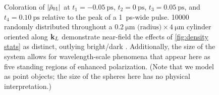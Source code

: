 \begin{figure}
  \centering
   \\
   \\
   \\
   \\
   \\
  \caption{\label{fig:tubes}
    Coloration of $\abs{\tilde{\rho}_{01}}$ at $t_1 = \SI{-0.05}{\pico\second}$, $t_2 = \SI{0}{\pico\second}$, $t_3 = \SI{0.05}{\pico\second}$, and $t_4 = \SI{0.10}{\pico\second}$ relative to the peak of a \SI{1}{\pico\second}-wide pulse.
    \num{10000} \qds{} randomly distributed throughout a $\SI{0.2}{\micro\meter} \text{ (radius)} \times \SI{4}{\micro\meter}$ cylinder oriented along $\vb{k}_L$ demonstrate near-field the effects of \cref{fig:density stats} as distinct, outlying bright/dark \qds{}.
    Additionally, the size of the system allows for wavelength-scale phenomena that appear here as five standing regions of enhanced polarization.
    (Note that we model \qds{} as point objects; the size of the spheres here has no physical interpretation.)
  }
\end{figure}

